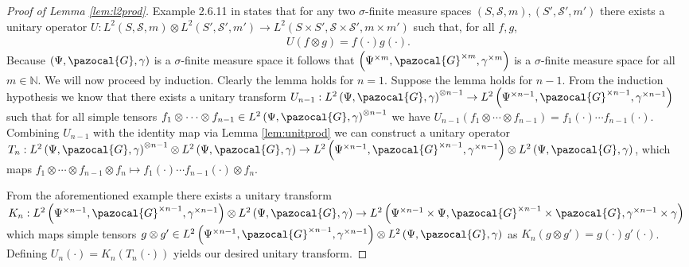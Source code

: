 \documentclass[aos]{imsart}
\def\sG{\pazocal{G}}
\theoremstyle{plain}
\theoremstyle{defintion}
\begin{document}
	\begin{proof}[Proof of Lemma \ref{lem:l2prod}]
		Example 2.6.11 in \cite{kadison83} states that for any two $\sigma$-finite measure spaces $\left( S,\mathscr{S}, m \right), \left( S',\mathscr{S}', m' \right)$ there exists a unitary operator $U: L^2\left( S,\mathscr{S}, m \right) \otimes L^2 \left( S',\mathscr{S'}, m' \right) \to L^2\left( S\times S', \mathscr{S}\times \mathscr{S'}, m\times m' \right)$ such that, for all $f,g$,
		\begin{eqnarray*}
			U(f\otimes g) = f(\cdot)g(\cdot).
		\end{eqnarray*}
		Because $\left( \Psi, \sG, \gamma \right)$ is a $\sigma$-finite measure space it follows that $\left( \Psi^{\times m}, \sG^{\times m}, \gamma^{\times m} \right)$ is a $\sigma$-finite measure space for all $m\in \mathbb{N}$. We will now proceed by induction. Clearly the lemma holds for $n=1$. Suppose the lemma holds for $n-1$. From the induction hypothesis we know that there exists a unitary transform $U_{n-1}: L^2\left( \Psi, \sG, \gamma \right)^{\otimes n-1} \to L^2 \left( \Psi^{\times n-1} ,\sG ^{\times n-1}  , \gamma^{\times n-1} \right)$ such that for all simple tensors $f_1\otimes\cdots \otimes f_{n-1} \in L^2\left( \Psi, \sG, \gamma \right)^{\otimes n-1}$ we have $U_{n-1}\left( f_1\otimes\cdots \otimes f_{n-1} \right) = f_1(\cdot)\cdots f_{n-1}\left( \cdot \right)$. Combining $U_{n-1}$ with the identity map via Lemma \ref{lem:unitprod} we can construct a unitary operator $T_n: L^2\left( \Psi, \sG, \gamma \right)^{\otimes n-1} \otimes L^2\left( \Psi, \sG, \gamma \right) \to L^2 \left( \Psi^{\times n-1} ,\sG ^{\times n-1}  , \gamma^{\times n-1} \right) \otimes L^2\left( \Psi, \sG, \gamma \right)$, which maps $f_1\otimes\cdots\otimes f_{n-1}  \otimes f_n \mapsto f_1(\cdot)\cdots f_{n-1}(\cdot) \otimes f_n$.

		From the aforementioned example there exists a unitary transform $K_n:L^2\left( \Psi^{\times n-1},\sG^{\times n-1}, \gamma^{\times n-1} \right)\otimes L^2\left( \Psi,\sG, \gamma \right)\to L^2 \left( \Psi^{\times n-1} \times \Psi,\sG ^{\times n-1} \times \sG , \gamma^{\times n-1}\times \gamma\right)$ which maps simple tensors $g\otimes g' \in L^2\left( \Psi^{\times n-1},\sG^{\times n-1}, \gamma^{\times n-1} \right)\otimes L^2\left( \Psi,\sG, \gamma \right)$ as $K_n\left( g\otimes g' \right) = g(\cdot) g'(\cdot)$. Defining $U_n(\cdot)= K_n\left( T_n \left( \cdot \right) \right)$ yields our desired unitary transform.
	\end{proof}
\end{document}
